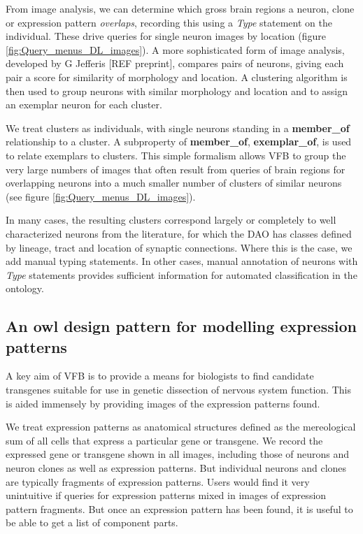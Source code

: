 \documentclass[runningheads,a4paper]{llncs}
\begin{document}
From image analysis, we can determine which gross brain regions a
neuron, clone or expression pattern \textit{overlaps}, recording this
using a \textit{Type} statement on the individual.  These drive queries for
single neuron images by location (figure
\ref{fig:Query_menus_DL_images}). A more sophisticated form of image
analysis, developed by G Jefferis [REF preprint], compares pairs of
neurons,  giving each pair a score for similarity of morphology and
location.  A clustering algorithm is then used to group neurons with
similar morphology and location and to assign an exemplar neuron for
each cluster.

We treat clusters as individuals, with single neurons standing in a
\textbf{member\_of} relationship to a cluster.  A subproperty of
\textbf{member\_of}, \textbf{exemplar\_of}, is used to relate
exemplars to clusters.  This simple formalism allows VFB to group the
very large numbers of images that often result from queries of brain
regions for overlapping neurons into a much smaller number of clusters
of similar neurons (see figure \ref{fig:Query_menus_DL_images}).

In many cases, the resulting clusters correspond largely or completely
to well characterized neurons from the literature, for which the DAO
has classes defined by lineage, tract and location of synaptic
connections. Where this is the case, we add manual typing
statements. In other cases, manual annotation of neurons with
\textit{Type} statements provides sufficient information for automated
classification in the ontology.

\subsection{An owl design pattern for modelling expression patterns}

A key aim of VFB is to provide a means for biologists to find
candidate transgenes suitable for use in genetic dissection of nervous
system function. This is aided immensely by providing images of the
expression patterns found.

We treat expression patterns as anatomical structures defined as the
mereological sum of all cells that express a particular gene or
transgene. We record the expressed gene or transgene shown in all
images, including those of neurons and neuron clones as well as
expression patterns.  But individual neurons and clones are typically
fragments of expression patterns. Users would find it very unintuitive
if queries for expression patterns mixed in images of expression
pattern fragments.   But once an expression pattern has been found,
it is useful to be able to get a list of component parts.
\end{document}
